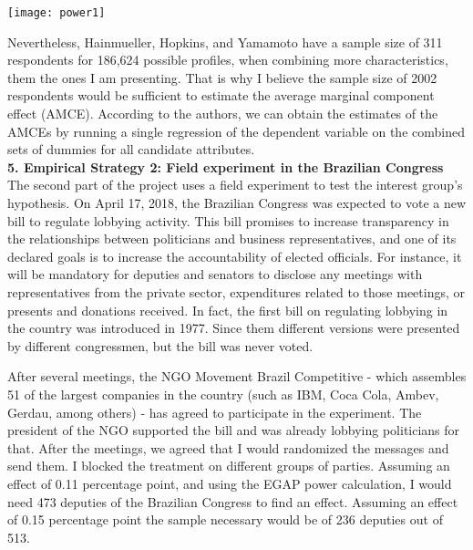 \documentclass[12pt,a4paper]{article}
\begin{document}
\texttt{[image: power1]}

Nevertheless, Hainmueller, Hopkins, and Yamamoto have a sample size of 311 respondents for 186,624 possible profiles, when combining more characteristics, them the ones I am presenting. That is why I believe the sample size of 2002 respondents would be sufficient to estimate the average marginal component effect (AMCE). According to the authors, we can obtain the estimates of the AMCEs by running a single regression of the dependent variable on the combined sets of dummies for all candidate attributes.\\
  

\textbf{5. Empirical Strategy 2: Field experiment in the Brazilian Congress }\\

The second part of the project uses a field experiment to test the interest group's hypothesis. On April 17, 2018, the Brazilian Congress was expected to vote a new bill to regulate lobbying activity. This bill promises to increase transparency in the relationships between politicians and business representatives, and one of its declared goals is to increase the accountability of elected officials. For instance, it will be mandatory for deputies and senators to disclose any meetings with representatives from the private sector, expenditures related to those meetings, or presents and donations received. In fact, the first bill on regulating lobbying in the country was introduced in 1977. Since them different versions were presented by different congressmen, but the bill was never voted.

After several meetings, the NGO Movement Brazil Competitive - which assembles 51 of the largest companies in the country (such as IBM, Coca Cola, Ambev, Gerdau, among others) - has agreed to participate in the experiment. The president of the NGO supported the bill and was already lobbying politicians for that. After the meetings, we agreed that I would randomized the messages and send them. I blocked the treatment on different groups of parties. Assuming an effect of 0.11 percentage point, and using the EGAP power calculation, I would need 473 deputies of the Brazilian Congress to find an effect. Assuming an effect of 0.15 percentage point the sample necessary would be of 236 deputies out of 513. 
\end{document}
